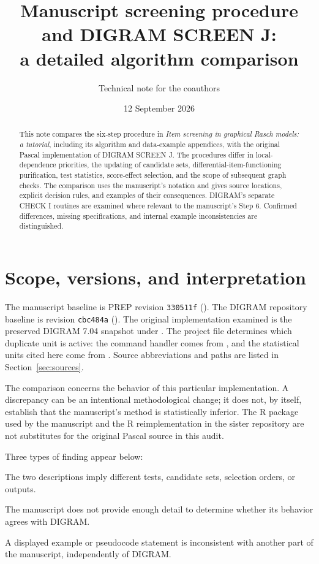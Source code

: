 \documentclass[11pt,a4paper]{article}
\title{Manuscript screening procedure and DIGRAM SCREEN J:\\
  a detailed algorithm comparison}
\author{Technical note for the coauthors}
\date{12 September 2026}
\begin{document}
\maketitle

\begin{abstract}
This note compares the six-step procedure in \emph{Item screening in graphical
Rasch models: a tutorial}, including its algorithm and data-example appendices,
with the original Pascal implementation of DIGRAM SCREEN J. The procedures
differ in local-dependence priorities, the updating of candidate sets,
differential-item-functioning purification, test statistics, score-effect
selection, and the scope of subsequent graph checks. The comparison uses the
manuscript's notation and gives source locations, explicit decision rules, and
examples of their consequences. DIGRAM's separate CHECK I routines are examined
where relevant to the manuscript's Step 6. Confirmed differences, missing
specifications, and internal example inconsistencies are distinguished.
\end{abstract}

\section{Scope, versions, and interpretation}
\label{sec:scope}
The manuscript baseline is PREP revision \texttt{330511f}
().
The DIGRAM repository baseline is revision \texttt{cbc484a}
().
The original implementation examined is the preserved DIGRAM 7.04 snapshot
under .
The project file  determines which duplicate unit is active:
the command handler comes from , and the statistical units cited
here come from . Source abbreviations and paths are listed in
Section~\ref{sec:sources}.

The comparison concerns the behavior of this particular implementation.
A discrepancy can be an intentional methodological change; it does not,
by itself, establish that the manuscript's method is statistically inferior.
The R package used by the manuscript and the R reimplementation in the sister
repository are not substitutes for the original Pascal source in this audit.

Three types of finding appear below:
\begin{description}[style=nextline,leftmargin=0pt,labelsep=0pt,labelwidth=0pt]
\item[Behavioral difference.]
The two descriptions imply different tests, candidate sets, selection orders,
or outputs.
\item[Specification gap.]
The manuscript does not provide enough detail to determine whether its
behavior agrees with DIGRAM.
\item[Internal manuscript issue.]
A displayed example or pseudocode statement is inconsistent with another
part of the manuscript, independently of DIGRAM.
\end{description}
\end{document}
